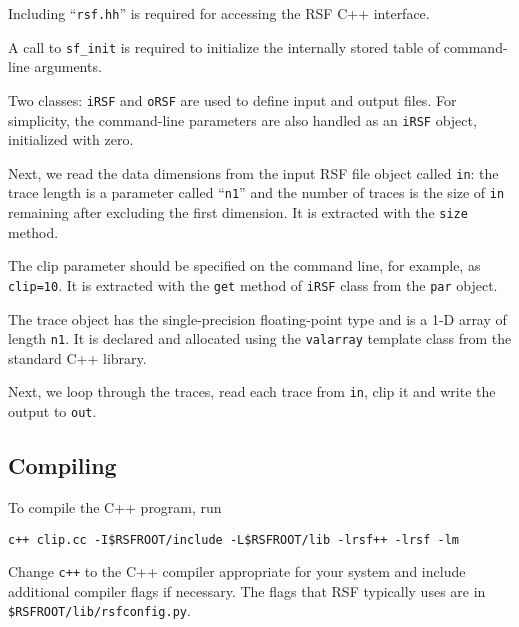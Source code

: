 
Including ``\texttt{rsf.hh}'' is required for accessing the RSF C++ interface.


A call to \texttt{sf\_init} is required to initialize the internally stored
table of command-line arguments.


Two classes: \texttt{iRSF} and \texttt{oRSF} are used to define input and
output files. For simplicity, the command-line parameters are also handled 
as an \texttt{iRSF} object, initialized with zero.


Next, we read the data dimensions from the input RSF file object called
\texttt{in}: the trace length is a parameter called ``\texttt{n1}'' and the
number of traces is the size of \texttt{in} remaining after excluding the
first dimension. It is extracted with the \texttt{size} method.

 The
clip parameter should be specified on the command line, for example, as
\texttt{clip=10}. It is extracted with the \texttt{get} method of
\texttt{iRSF} class from the \texttt{par} object.

 The
trace object has the single-precision floating-point type and is a 1-D array
of length \texttt{n1}. It is declared and allocated using the
\texttt{valarray} template class from the standard C++ library.


Next, we loop through the traces, read each trace from \texttt{in}, clip it
and write the output to \texttt{out}.

\subsection{Compiling}

To compile the C++ program, run
\begin{verbatim}
c++ clip.cc -I$RSFROOT/include -L$RSFROOT/lib -lrsf++ -lrsf -lm
\end{verbatim}
Change \texttt{c++} to the C++ compiler appropriate for your system and
include additional compiler flags if necessary. The flags that RSF typically
uses are in \texttt{\$RSFROOT/lib/rsfconfig.py}.

